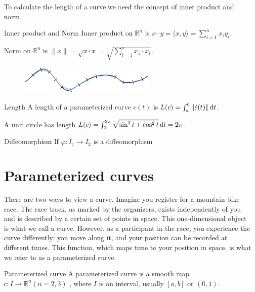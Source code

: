 To calculate the length of a curve,we need the concept of inner product and norm.

\begin{definition}{Inner product and Norm}
    Inner product on $\mathbb{R}^n$ is $x\cdot y = \langle x,y \rangle=\sum_{i=1}^n{x_iy_i}$.\par
    Norm on $\mathbb{R}^n$ is $\|x\|=\sqrt{x\cdot x}=\sqrt{\sum_{i=1}^n{x_1\cdot x_i}}$.
\end{definition}

\begin{figure}[h]
    \centering
    \includegraphics[width=0.6\textwidth]{fig/1.3.png}
\end{figure}

\begin{definition}{Length}
    A length of a parameterized curve $c(t)$ is $L(c) = \int_a^b{\|\dot{c}(t)\|}\,\mathrm{d} t$.
\end{definition}

\begin{instance}
    A unit circle has length $L(c)=\int_0^{2\pi}{\sqrt{\sin^2t+\cos^2t}}\,\mathrm{d} t=2\pi$.
\end{instance}

\begin{definition}{Diffeomorphism}
    If $\varphi:I_1\to I_2$ is a diffeomorphism
\end{definition}



\section{Parameterized curves}

There are two ways to view a curve. Imagine you register for a mountain bike race. The race track, as marked by the organizers, exists independently of you and is described by a certain set of points in space. This one-dimensional object is what we call a curve. However, as a participant in the race, you experience the curve differently: you move along it, and your position can be recorded at different times. This function, which maps time to your position in space, is what we refer to as a parameterized curve.

\begin{definition}{Parameterized curve}
    A parameterized curve is a smooth map \(c : I \rightarrow  {\mathbb{R}}^{n}\left( {n = 2,3}\right)\) , where \(I\) is an interval, usually \(\left\lbrack  {a,b}\right\rbrack\) or $(0,1)$.
\end{definition}

